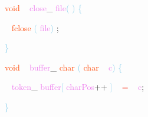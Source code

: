 \documentclass[8, usernames, dvipsnames]{beamer}
\begin{document}
\begin{frame}

 
 \textcolor{OrangeRed}{void}
\textcolor{White}{\ }
\textcolor{Violet}{close}\textcolor{Sepia}{\_}
\textcolor{Violet}{file}\textcolor{SkyBlue}{(}
\textcolor{SkyBlue}{)}
\textcolor{SkyBlue}{\{ }

 \textcolor{White}{\   }
\textcolor{OrangeRed}{fclose}
\textcolor{SkyBlue}{(}
\textcolor{Violet}{file}\textcolor{SkyBlue}{)}
\textcolor{Sepia}{;}

 \textcolor{SkyBlue}{\} }

 
 \textcolor{OrangeRed}{void}
\textcolor{White}{\ }
\textcolor{Violet}{buffer}\textcolor{Sepia}{\_}
\textcolor{OrangeRed}{char}
\textcolor{SkyBlue}{(}
\textcolor{OrangeRed}{char}
\textcolor{White}{\ }
\textcolor{Violet}{c}\textcolor{SkyBlue}{)}
\textcolor{SkyBlue}{\{ }

 \textcolor{White}{\   }
\textcolor{Violet}{token}\textcolor{Sepia}{\_}
\textcolor{Violet}{buffer}\textcolor{SkyBlue}{[}
\textcolor{Violet}{charPos}\textcolor{Apricot}{++}
\textcolor{SkyBlue}{]}
\textcolor{White}{\ }
\textcolor{Salmon}{=}
\textcolor{White}{\ }
\textcolor{Violet}{c}\textcolor{Sepia}{;}

 \textcolor{SkyBlue}{\} }

 
 \end{frame}
\end{document}
